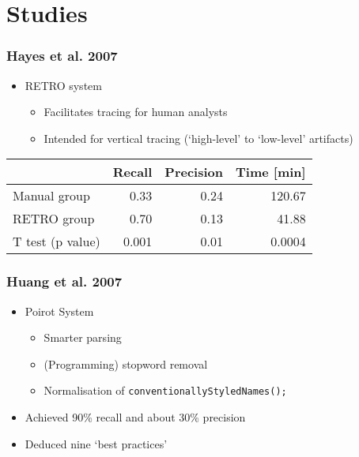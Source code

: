 \documentclass{beamer}
\begin{document}

\section{Studies}
\begin{frame}
\frametitle{Hayes et al. 2007}
\begin{itemize}
\item RETRO system
  \begin{itemize}
  \item Facilitates tracing for human analysts
  \item Intended for vertical tracing (`high-level' to `low-level' artifacts)
  \end{itemize}
\end{itemize}

\begin{table}
  \begin{tabular}{l r r r}
    \toprule
    &Recall&Precision&Time [min]\\
    \midrule
  Manual group&0.33&0.24&120.67\\
  RETRO group&0.70&0.13&41.88\\
  T test (p value)&0.001&0.01&0.0004\\
  \bottomrule
\end{tabular}
\end{table}

\end{frame}


\begin{frame}
\frametitle{Huang et al. 2007}
\begin{itemize}
\item Poirot System
  \begin{itemize}
  \item Smarter parsing
  \item (Programming) stopword removal
  \item Normalisation of {\tt conventionallyStyledNames();}
  \end{itemize}
\item Achieved 90\% recall and about 30\% precision
\item Deduced nine `best practices'
\end{itemize}
\end{frame}
\end{document}
